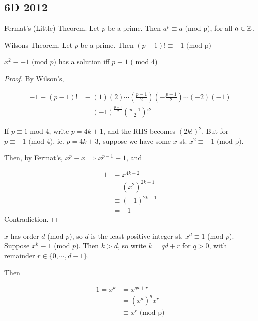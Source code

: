 \documentclass[a4paper]{article}
\begin{document}
\subsection*{6D 2012}

\begin{thm} Fermat's (Little) Theorem.
	Let $ p $ be a prime. Then $ a^{p} \equiv a \text{ (mod p)} $, for all $ a \in \mathbb{Z} $.
\end{thm}

\begin{thm} Wilsons Theorem.
	Let $ p $ be a prime. Then $ (p-1)! \equiv -1 \text{ (mod p)} $
\end{thm}

\begin{prop} $ x^{2} \equiv -1 \text{ (mod } p) $ has a solution iff $ p \equiv 1 $ ( mod 4)
\end{prop}

\begin{proof}
	By Wilson's,
	
	\begin{align*}
	-1 \equiv (p-1)! & \equiv (1)(2) \cdots  \left( \frac{p-1}{2} \right) \left( - \frac{p-1}{2} \right) \cdots (-2)(-1) \\
	& = (-1)^{\frac{p-1}{2}} \left( \frac{p-1}{2} \right)!^{2} 
	\end{align*}


If $ p \equiv 1 \text{ mod 4} $, write $ p = 4k + 1 $, and the RHS becomes $ (2k!)^{2} $. But for $ p \equiv -1 \text{ (mod 4)}$, ie. $ p = 4k + 3 $, suppose we have some $ x $ st. $ x^{2} \equiv -1 \text{ (mod p)} $.

Then, by Fermat's, $ x^{p} \equiv x \; \Rightarrow x^{p-1} \equiv 1 $, and

\begin{align*}
1 & \equiv x^{4k + 2}  \\
& = (x^{2})^{2k + 1} \\
& \equiv (-1)^{2k + 1}\\
& = -1 
\end{align*} 
Contradiction. 
\end{proof}

$ x $ has order $ d $ (mod $ p $), so $ d $ is the least positive integer st. $ x^{d} \equiv 1 $ (mod $ p $).
Suppose $ x^{k} \equiv 1 $ (mod $ p $). Then $ k > d $, so write $ k = qd + r $ for $ q > 0 $, with remainder $ r \in \{ 0,\cdots,d-1 \} $.

Then

\begin{align*}
1 = x^{k} & = x^{qd + r} \\
& = (x^{d})^{q} x^{r} \\
& \equiv x^{r} \text{ (mod p)}
\end{align*}
\end{document}

